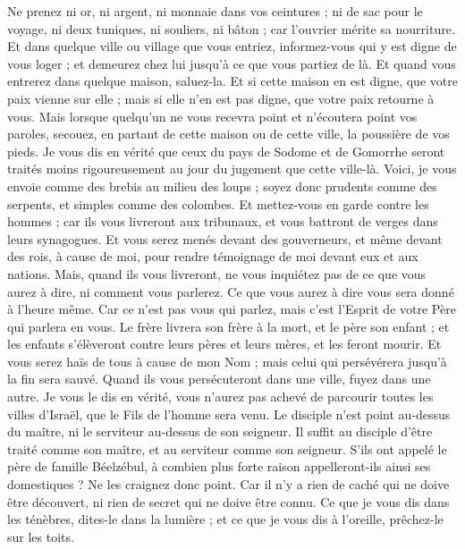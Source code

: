 \begin{multicols}{2}
Ne prenez ni or, ni argent, ni monnaie dans vos ceintures ;
ni de sac pour le voyage, ni deux tuniques, ni souliers, ni bâton ; car l'ouvrier mérite sa nourriture.
Et dans quelque ville ou village que vous entriez, informez-vous qui y est digne de vous loger ; et demeurez chez lui jusqu'à ce que vous partiez de là.
Et quand vous entrerez dans quelque maison, saluez-la.
Et si cette maison en est digne, que votre paix vienne sur elle ; mais si elle n'en est pas digne, que votre paix retourne à vous.
Mais lorsque quelqu'un ne vous recevra point et n'écoutera point vos paroles, secouez, en partant de cette maison ou de cette ville, la poussière de vos pieds.
Je vous dis en vérité que ceux du pays de Sodome et de Gomorrhe seront traités moins rigoureusement au jour du jugement que cette ville-là.
Voici, je vous envoie comme des brebis au milieu des loups ; soyez donc prudents comme des serpents, et simples comme des colombes.
Et mettez-vous en garde contre les hommes ; car ils vous livreront aux tribunaux, et vous battront de verges dans leurs synagogues.
Et vous serez menés devant des gouverneurs, et même devant des rois, à cause de moi, pour rendre témoignage de moi devant eux et aux nations.
Mais, quand ils vous livreront, ne vous inquiétez pas de ce que vous aurez à dire, ni comment vous parlerez. Ce que vous aurez à dire vous sera donné à l'heure même.
Car ce n'est pas vous qui parlez, mais c'est l'Esprit de votre Père qui parlera en vous.
Le frère livrera son frère à la mort, et le père son enfant ; et les enfants s'élèveront contre leurs pères et leurs mères, et les feront mourir.
Et vous serez haïs de tous à cause de mon Nom ; mais celui qui persévérera jusqu'à la fin sera sauvé.
Quand ils vous persécuteront dans une ville, fuyez dans une autre. Je vous le dis en vérité, vous n'aurez pas achevé de parcourir toutes les villes d'Israël, que le Fils de l'homme sera venu.
Le disciple n'est point au-dessus du maître, ni le serviteur au-dessus de son seigneur.
Il suffit au disciple d'être traité comme son maître, et au serviteur comme son seigneur. S'ils ont appelé le père de famille Béelzébul, à combien plus forte raison appelleront-ils ainsi ses domestiques ?
Ne les craignez donc point. Car il n'y a rien de caché qui ne doive être découvert, ni rien de secret qui ne doive être connu.
Ce que je vous dis dans les ténèbres, dites-le dans la lumière ; et ce que je vous dis à l'oreille, prêchez-le sur les toits.

\end{multicols}
